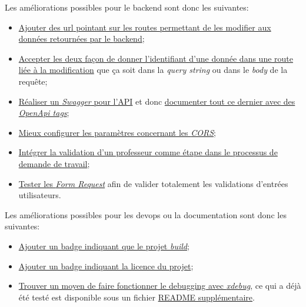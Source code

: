 \documentclass[
    iai, %
    il, %
]{heig-tb}
\begin{document}
Les améliorations possibles pour le \Gls{backend} sont donc les suivantes:
\begin{itemize}
    \item \href{https://github.com/heig-fablab/fablab-manager/issues/41}{Ajouter des \Gls{url} pointant sur les routes permettant de les modifier aux données retournées par le \Gls{backend}};
    \item \href{https://github.com/heig-fablab/fablab-manager/issues/100}{Accepter les deux façon de donner l'identifiant d'une donnée dans une route liée à la modification} que ça soit dans la \emph{query string} ou dans le \emph{body} de la requête;
    \item \href{https://github.com/heig-fablab/fablab-manager/issues/22}{Réaliser un \emph{Swagger} pour l'API} et donc \href{https://github.com/heig-fablab/fablab-manager/issues/45}{documenter tout ce dernier avec des \emph{OpenApi tags}};
    \item \href{https://github.com/heig-fablab/fablab-manager/issues/83}{Mieux configurer les paramètres concernant les \emph{CORS}};
    \item \href{https://github.com/heig-fablab/fablab-manager/issues/89}{Intégrer la validation d'un professeur comme étape dans le processus de demande de travail};
    \item \href{https://github.com/heig-fablab/fablab-manager/issues/93}{Tester les \emph{Form Request}} afin de valider totalement les validations d'entrées utilisateurs.
\end{itemize}

Les améliorations possibles pour les \Gls{devops} ou la documentation sont donc les suivantes:
\begin{itemize}
    \item \href{https://github.com/heig-fablab/fablab-manager/issues/126}{Ajouter un badge indiquant que le projet \emph{build}};
    \item \href{https://github.com/heig-fablab/fablab-manager/issues/127}{Ajouter un badge indiquant la licence du projet};
    \item \href{https://github.com/heig-fablab/fablab-manager/issues/134}{Trouver un moyen de faire fonctionner le debugging avec \emph{xdebug}}, ce qui a déjà été testé est disponible sous un fichier \href{https://github.com/heig-fablab/fablab-manager/blob/main/README-coverage-debug-part.md}{README supplémentaire}.
\end{itemize}
\end{document}
